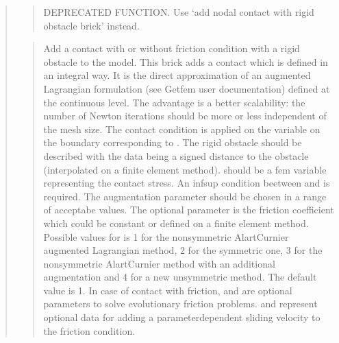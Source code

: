 \documentclass[a4paper,11pt,english]{sphinxmanual}
\begin{document}
\begin{quote}
\begin{quote}
DEPRECATED FUNCTION. Use ‘add nodal contact with rigid obstacle brick’ instead.
\end{quote}

\begin{quote}

Add a contact with or without friction condition with a rigid obstacle
to the model. This brick adds a contact which is defined
in an integral way. It is the direct approximation of an augmented
Lagrangian formulation (see Getfem user documentation) defined at the
continuous level. The advantage is a better scalability: the number of
Newton iterations should be more or less independent of the mesh size.
The contact condition is applied on the variable 
on the boundary corresponding to . The rigid obstacle should
be described with the data  being a signed distance to
the obstacle (interpolated on a finite element method).
 should be a fem variable representing the contact stress.
An inf\sphinxhyphen{}sup condition beetween  and  is required.
The augmentation parameter  should be chosen in a
range of acceptabe values.
The optional parameter  is the friction
coefficient which could be constant or defined on a finite element method.
Possible values for  is 1 for the non\sphinxhyphen{}symmetric Alart\sphinxhyphen{}Curnier
augmented Lagrangian method, 2 for the symmetric one, 3 for the
non\sphinxhyphen{}symmetric Alart\sphinxhyphen{}Curnier method with an additional augmentation
and 4 for a new unsymmetric method. The default value is 1.
In case of contact with friction,  and 
are optional parameters to solve evolutionary friction problems.
 and  represent optional data for adding
a parameter\sphinxhyphen{}dependent sliding velocity to the friction condition.
\end{quote}


\end{quote}
\end{document}
